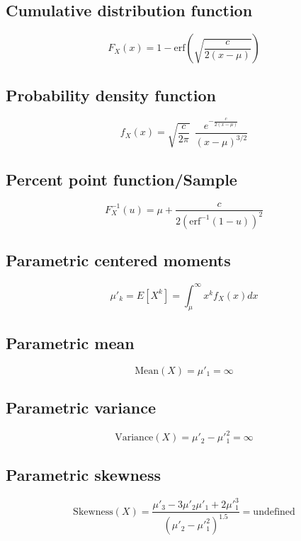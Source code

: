 \documentclass{article}
\begin{document}
\subsection{Cumulative distribution function}
\begin{equation*} F_{X}\left(x\right)=1-\textrm{erf}\left(\sqrt{\frac{c}{2(x-\mu)}}\right) \end{equation*}
\subsection{Probability density function}
\begin{equation*} f_{X}\left(x\right)=\sqrt{\frac{c}{2\pi}}~~\frac{e^{-\frac{c}{2(x-\mu)}}}{(x-\mu)^{3/2}} \end{equation*}
\subsection{Percent point function/Sample}
\begin{equation*} F^{-1}_{X}\left(u\right)=\mu+\frac{c}{2\left(\textrm{erf}^{-1}(1-u)\right)^2} \end{equation*}
\subsection{Parametric centered moments}
\begin{equation*} \mu'_{k}=E[X^k]=\int_{\mu }^{\infty }x^{k}f_{X}\left(x\right)dx \end{equation*}
\subsection{Parametric mean}
\begin{equation*} \mathrm{Mean}(X)=\mu'_{1}=\infty \end{equation*}
\subsection{Parametric variance}
\begin{equation*} \mathrm{Variance}(X)=\mu'_{2}-\mu'^{2}_{1}=\infty \end{equation*}
\subsection{Parametric skewness}
\begin{equation*} \mathrm{Skewness}(X)=\frac{\mu'_{3}-3\mu'_{2}\mu'_{1}+2\mu'^{3}_{1}}{(\mu'_{2}-\mu'^{2}_{1})^{1.5}}=\text{undefined} \end{equation*}
\end{document}
